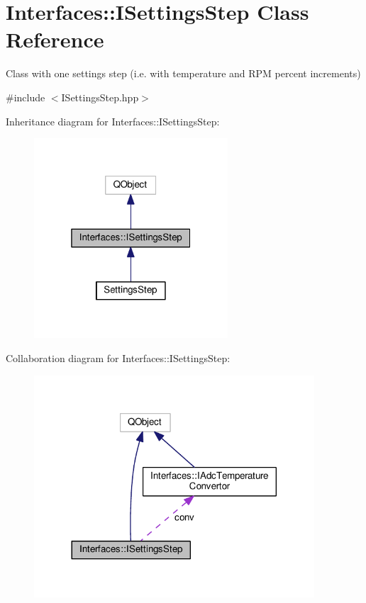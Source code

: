 \hypertarget{class_interfaces_1_1_i_settings_step}{}\section{Interfaces\+:\+:I\+Settings\+Step Class Reference}
\label{class_interfaces_1_1_i_settings_step}


Class with one settings step (i.\+e. with temperature and R\+PM percent increments)  




{\ttfamily \#include $<$I\+Settings\+Step.\+hpp$>$}



Inheritance diagram for Interfaces\+:\+:I\+Settings\+Step\+:\nopagebreak
\begin{figure}[H]
\begin{center}
\leavevmode
\includegraphics[width=205pt]{class_interfaces_1_1_i_settings_step__inherit__graph}
\end{center}
\end{figure}


Collaboration diagram for Interfaces\+:\+:I\+Settings\+Step\+:\nopagebreak
\begin{figure}[H]
\begin{center}
\leavevmode
\includegraphics[width=296pt]{class_interfaces_1_1_i_settings_step__coll__graph}
\end{center}
\end{figure}

